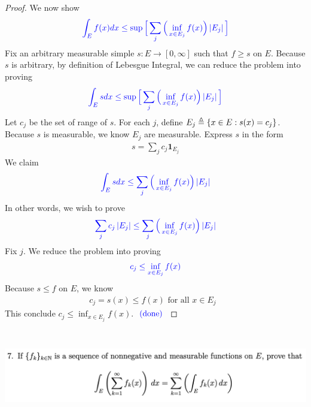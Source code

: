 \documentclass{report}
\begin{document}
\begin{proof}
We now show 
\begin{align*}
\textcolor{blue}{\int_E f(x)dx \leq  \sup \Big[ \sum_j \Big(\inf_{x \in E_j}f(x) \Big) \left|E_j\right|\Big]}
\end{align*}
Fix an arbitrary measurable simple $s:E\rightarrow [0,\infty]$ such that $f\geq s$ on $E$. Because $s$ is arbitrary, by definition of Lebesgue Integral, we can reduce the problem into proving 
\begin{align*}
\textcolor{blue}{\int_E sdx \leq  \sup \Big[ \sum_j \Big(\inf_{x \in E_j}f(x) \Big) \left|E_j\right|\Big]}
\end{align*}
Let $c_j$ be the set of range of $s$. For each $j$, define $E_j\triangleq \{ x\in E: s(x)=c_j \}$. Because $s$ is measurable, we know  $E_j$ are measurable. Express $s$ in the form  
\begin{align*}
s= \sum_j c_j \textbf{1}_{E_j} 
\end{align*}
We claim 
\begin{align*}
\textcolor{blue}{\int_E sdx\leq \sum_j \Big( \inf_{x \in E_j}f(x) \Big) \left|E_j\right|}
\end{align*}
In other words, we wish to prove 
\begin{align*}
  \textcolor{blue}{\sum_{j} c_j \left|E_j\right|\leq \sum_j \Big(\inf_{x \in E_j}f(x) \Big)\left|E_j\right|}
\end{align*}
Fix $j$. We reduce the problem into proving 
\begin{align*}
  \textcolor{blue}{c_j\leq \inf_{x \in E_j}f(x)}
\end{align*}
Because $s\leq f$ on $E$, we know
\begin{align*}
c_j=s(x)\leq f(x)\text{ for all $x \in E_j$ }
\end{align*}
This conclude $c_j\leq \inf_{x \in E_j}f(x)$. $\textcolor{blue}{\text{ (done) }}$    
\end{proof}
\begin{question}{}{}
\includegraphics[height=4cm,width=18cm]{hw6a7}
\end{question}
\end{document}
